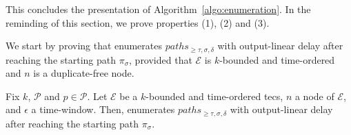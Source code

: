 This concludes the presentation of Algorithm~\ref{algo:enumeration}. In the reminding of this section, we prove properties (1), (2) and (3).

We start by proving that  enumerates $paths_{\ge \tau, \sigma, \delta}$ with output-linear delay after reaching the starting path $\pi_{\sigma}$, provided that $\mathcal{E}$ is $k$-bounded and time-ordered and $n$ is a duplicate-free node.

\begin{lemma}\label{lemma:enumeration:process}
  Fix $k$, $\mathcal{P}$ and $p \in \mathcal{P}$. Let $\mathcal{E}$ be a $k$-bounded and time-ordered \acrshort{tecs}, $n$ a node of $\mathcal{E}$, and $\epsilon$ a time-window. Then,  enumerates $paths_{\ge \tau, \sigma, \delta}$ with output-linear delay after reaching the starting path $\pi_{\sigma}$.
\end{lemma}

